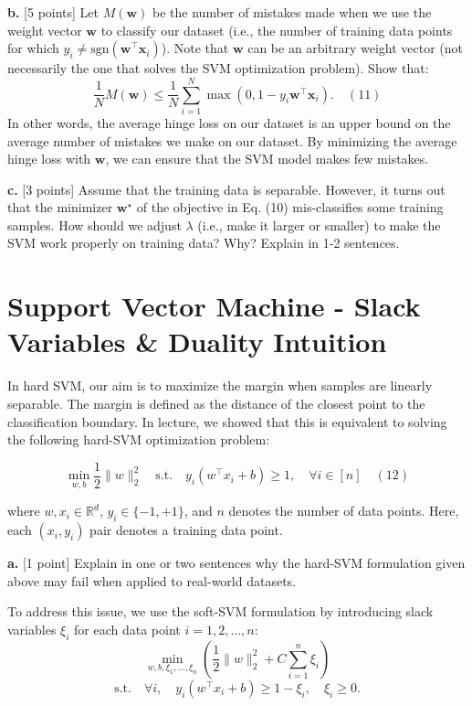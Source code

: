 \documentclass[a3paper,12pt]{extarticle} %
\begin{document}
\noindent \textbf{b.} [5 points] Let \( M(\mathbf{w}) \) be the number of mistakes made when we use the weight vector \( \mathbf{w} \) to classify our dataset (i.e., the number of training data points for which \( y_i \neq \text{sgn}(\mathbf{w}^\top \mathbf{x}_i) \)). Note that \( \mathbf{w} \) can be an arbitrary weight vector (not necessarily the one that solves the SVM optimization problem). Show that:
\[
\frac{1}{N} M(\mathbf{w}) \leq \frac{1}{N} \sum_{i=1}^N \max \left( 0, 1 - y_i \mathbf{w}^\top \mathbf{x}_i \right). \quad (11)
\]
In other words, the average hinge loss on our dataset is an upper bound on the average number of mistakes we make on our dataset. By minimizing the average hinge loss with \( \mathbf{w} \), we can ensure that the SVM model makes few mistakes.

\noindent \textbf{c.} [3 points] Assume that the training data is separable. However, it turns out that the minimizer \( \mathbf{w}^\star \) of the objective in Eq. (10) mis-classifies some training samples. How should we adjust \( \lambda \) (i.e., make it larger or smaller) to make the SVM work properly on training data? Why? Explain in 1-2 sentences.


\newpage
\section{Support Vector Machine - Slack Variables \& Duality Intuition}

In hard SVM, our aim is to maximize the margin when samples are linearly separable. The margin is defined as the distance of the closest point to the classification boundary. In lecture, we showed that this is equivalent to solving the following hard-SVM optimization problem:

\[
\min_{w, b} \frac{1}{2} \|w\|_2^2 \quad \text{s.t.} \quad y_i(w^\top x_i + b) \geq 1, \quad \forall i \in [n] \quad (12)
\]

where \( w, x_i \in \mathbb{R}^d \), \( y_i \in \{-1, +1\} \), and \( n \) denotes the number of data points. Here, each \( (x_i, y_i) \) pair denotes a training data point.

\noindent \textbf{a.} [1 point] Explain in one or two sentences why the hard-SVM formulation given above may fail when applied to real-world datasets.

To address this issue, we use the soft-SVM formulation by introducing slack variables $\xi_i$ for each data point $i = 1, 2, \ldots, n$:
\[
\min_{w, b, \xi_1, \ldots, \xi_n} \left( \frac{1}{2} \|w\|_2^2 + C \sum_{i=1}^n \xi_i \right)
\]
\[
\text{s.t.} \quad \forall i, \quad y_i(w^\top x_i + b) \geq 1 - \xi_i, \quad \xi_i \geq 0.
\]
\end{document}
